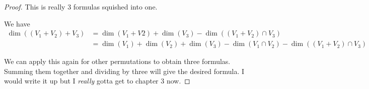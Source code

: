 \begin{enumerate}
            \begin{proof}
                This is really 3 formulas squished into one. 

                We have 
                \begin{align*}
                \dim((V_1 + V_2) + V_3) &= \dim(V_1 + V2) + \dim(V_3) - \dim((V_1 + V_2) \cap V_3) \\
                &= \dim(V_1) + \dim(V_2) + \dim(V_3) - \dim(V_1 \cap V_2) - \dim((V_1 + V_2) \cap V_3)
                \end{align*}

                We can apply this again for other permutations to obtain three formulas. Summing them together and dividing by three will give the desired formula. I would write it up but I \emph{really} gotta get to chapter 3 now.
            \end{proof}



\end{enumerate}